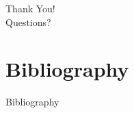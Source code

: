 \begin{frame}[plain]{}
\Huge\centering
Thank You!\\
\bigskip
\normalsize
Questions?
\end{frame}


\section*{Bibliography}
\begin{frame}[allowframebreaks]{Bibliography}
\nocite{*}


\end{frame}



